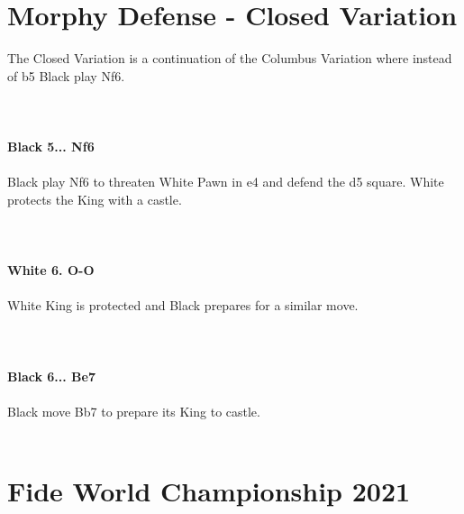 \documentclass{article}
\begin{document}
\section{ Morphy Defense - Closed Variation}

The Closed Variation is a continuation of the Columbus Variation where instead of b5 Black play Nf6.\\
\\

\\
\\
\textbf{Black 5... Nf6}\\
\\
Black play Nf6 to threaten White Pawn in e4 and defend the d5 square. White protects the King with a castle.\\
\\

\\
\\
\textbf{White 6. O-O}\\
\\
White King is protected and Black prepares for a similar move.\\
\\

\\
\\
\textbf{Black 6... Be7}\\
\\
Black move Bb7 to prepare its King to castle.\\
\\
\section{ Fide World Championship 2021}
\end{document}

